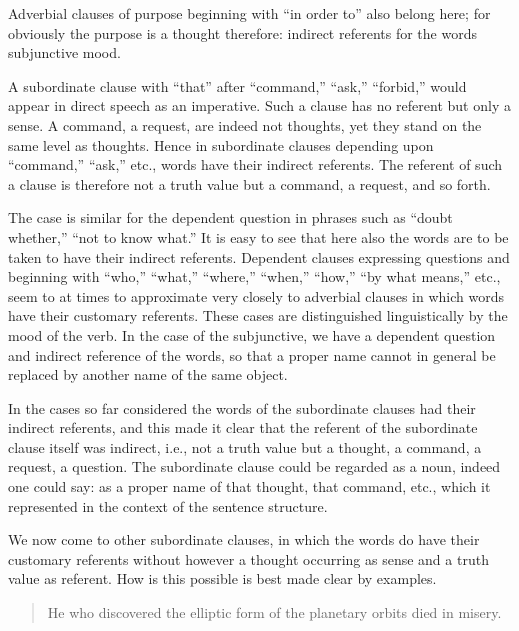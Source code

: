 \documentclass[twoside,12pt,a4paper]{article}
\begin{document}
Adverbial clauses of purpose beginning with ``in order to'' also
belong here; for obviously the purpose is a thought therefore:
indirect referents for the words subjunctive mood.

A subordinate clause with ``that'' after ``command,'' ``ask,''
``forbid,'' would appear in direct speech as an imperative. Such a
clause has no referent but only a sense. A command, a request, are
indeed not thoughts, yet they stand on the same level as thoughts.
Hence in subordinate  clauses depending upon
``command,'' ``ask,'' etc., words have their indirect referents. The
referent of such a clause is therefore not a truth value but a
command, a request, and so forth.

The case is similar for the dependent question in phrases such as
``doubt whether,'' ``not to know what.'' It is easy to see that here
also the words are to be taken to have their indirect referents.
Dependent clauses expressing questions and beginning with ``who,''
``what,'' ``where,'' ``when,'' ``how,'' ``by what means,'' etc., seem
to at times to approximate very closely to adverbial clauses in which
words have their customary referents. These cases are distinguished
linguistically by the mood of the verb. In the case of the
subjunctive, we have a dependent question and indirect reference of
the words, so that a proper name cannot in general be replaced by
another name of the same object.

In the cases so far considered the words of the subordinate clauses
had their indirect referents, and this made it clear that the referent
of the subordinate clause itself was indirect, i.e., not a truth value
but a thought, a command, a request, a question. The subordinate
clause could be regarded as a noun, indeed one could say: as a proper
name of that thought, that command, etc., which it represented in the
context of the sentence structure.

We now come to other subordinate clauses, in which the words do have
their customary referents without however a thought occurring as sense
and a truth value as referent. How is this possible is best made clear
by examples.

\begin{quote}
  He who discovered the elliptic form of the planetary orbits died in misery.
\end{quote}
\end{document}
